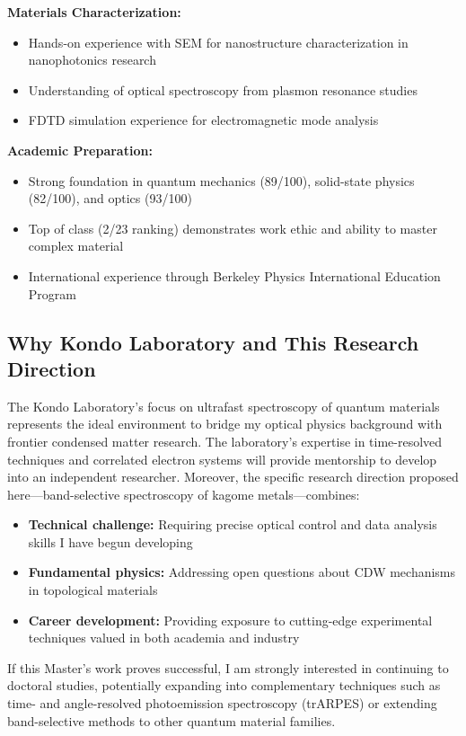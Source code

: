 \documentclass[12pt,a4paper]{article}
\begin{document}
\textbf{Materials Characterization:}
\begin{itemize}
    \item Hands-on experience with SEM for nanostructure characterization in nanophotonics research
    \item Understanding of optical spectroscopy from plasmon resonance studies
    \item FDTD simulation experience for electromagnetic mode analysis
\end{itemize}

\textbf{Academic Preparation:}
\begin{itemize}
    \item Strong foundation in quantum mechanics (89/100), solid-state physics (82/100), and optics (93/100)
    \item Top of class (2/23 ranking) demonstrates work ethic and ability to master complex material
    \item International experience through Berkeley Physics International Education Program
\end{itemize}

\subsection{Why Kondo Laboratory and This Research Direction}

The Kondo Laboratory's focus on ultrafast spectroscopy of quantum materials represents the ideal environment to bridge my optical physics background with frontier condensed matter research. The laboratory's expertise in time-resolved techniques and correlated electron systems will provide mentorship to develop into an independent researcher. Moreover, the specific research direction proposed here—band-selective spectroscopy of kagome metals—combines:

\begin{itemize}
    \item \textbf{Technical challenge:} Requiring precise optical control and data analysis skills I have begun developing
    \item \textbf{Fundamental physics:} Addressing open questions about CDW mechanisms in topological materials
    \item \textbf{Career development:} Providing exposure to cutting-edge experimental techniques valued in both academia and industry
\end{itemize}

If this Master's work proves successful, I am strongly interested in continuing to doctoral studies, potentially expanding into complementary techniques such as time- and angle-resolved photoemission spectroscopy (trARPES) or extending band-selective methods to other quantum material families.
\end{document}

